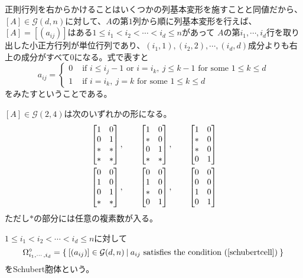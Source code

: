 \documentclass{ltjsreport}
\begin{document}
正則行列を右からかけることはいくつかの列基本変形を施すことと同値だから、$[A]\in\mathcal{G}(d,n)$に対して、$A$の第$1$列から順に列基本変形を行えば、$[A]=[(a_{ij})]$はある$1\leq i_1<i_2<\cdots<i_d\leq n$があって
$A$の第$i_1,\cdots,i_d$行を取り出した小正方行列が単位行列であり、$(i_1,1),(i_2,2),\cdots,(i_d,d)$成分よりも右上の成分がすべて$0$になる。式で表すと
\begin{equation}\label{schubertcell}
a_{ij}=\left\{\begin{array}{cl}
  0 & \text{ if } i \leq i_{j}-1 \text{ or } i=i_k,\: j\leq k-1 \text{ for some $1\leq k\leq d$}\\
  1 & \text{ if } i = i_k,\: j = k \text{ for some $1\leq k\leq d$}
\end{array}\right.  
\end{equation}
をみたすということである。

\begin{eg}
  $[A]\in\mathcal{G}(2,4)$は次のいずれかの形になる。
  \begin{align*}
    &\begin{bmatrix} 
      1 & 0\\
      0 & 1\\
      * & *\\
      * & *
     \end{bmatrix},\qquad 
    \begin{bmatrix} 
      1 & 0\\
      * & 0\\
      0 & 1\\
      * & *
     \end{bmatrix},\qquad
    \begin{bmatrix} 
      1 & 0\\
      * & 0\\
      * & 0\\
      0 & 1
     \end{bmatrix}\\
    &\begin{bmatrix} 
      0 & 0\\
      1 & 0\\
      0 & 1\\
      * & *
     \end{bmatrix},\qquad
    \begin{bmatrix} 
      0 & 0\\
      1 & 0\\
      * & 0\\
      0 & 1
     \end{bmatrix},\qquad
    \begin{bmatrix} 
      0 & 0\\
      0 & 0\\
      1 & 0\\
      0 & 1
     \end{bmatrix}
  \end{align*}
  ただし$*$の部分には任意の複素数が入る。
\end{eg}

\begin{defin}
  $1\leq i_1<i_2<\cdots<i_d\leq n$に対して
  \[
  \Omega^\circ_{i_1,\cdots,i_d}=\left\{\:[(a_{ij})]\in\mathcal{G}(d,n)\:\middle|\:a_{ij}\text{ satisfies the condition (\ref{schubertcell})}\:\right\}  
  \]
  をSchubert胞体という。
\end{defin}
\end{document}
